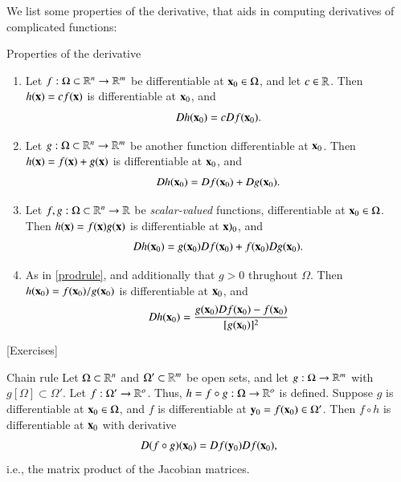 We list some properties of the derivative, that aids in computing derivatives of complicated functions:
\begin{myTheorem}{Properties of the derivative}{}
\begin{enumerate}
    \item Let $f : \Omega \subset \mathbb{R}^n \to \mathbb{R}^m$ be differentiable at $\mathbf{x}_0\in\Omega$, and let $c \in \mathbb{R}$. Then $h(\mathbf{x}) = c f(\mathbf{x})$ is differentiable at $\mathbf{x}_0$, and
    \begin{equation}
        D h(\mathbf{x}_0) = c D f(\mathbf{x}_0).
    \end{equation}
    \item Let $g : \Omega \subset \mathbb{R}^n \to \mathbb{R}^m$ be another function differentiable at $\mathbf{x}_0$. Then $h(\mathbf{x}) = f(\mathbf{x}) + g(\mathbf{x})$ is differentiable at $\mathbf{x}_0$, and
    \begin{equation}
        D h(\mathbf{x}_0) = D f(\mathbf{x}_0) + Dg(\mathbf{x}_0).
    \end{equation}
    \item\label{prodrule} Let $f,g : \Omega \subset\mathbb{R}^n\to \mathbb{R}$ be \emph{scalar-valued} functions, differentiable at $\mathbf{x}_0\in\Omega$. Then $h(\mathbf{x}) = f(\mathbf{x})g(\mathbf{x})$ is differentiable at $\mathbf{x})_0$, and
    \begin{equation}
        Dh(\mathbf{x}_0) = g(\mathbf{x}_0)Df(\mathbf{x}_0) + f(\mathbf{x}_0) Dg(\mathbf{x}_0).
    \end{equation}
    \item As in \ref{prodrule}, and additionally that $g >0$ thrughout $\Omega$. Then $h(\mathbf{x}_0) = f(\mathbf{x}_0)/g(\mathbf{x}_0)$ is differentiable at $\mathbf{x}_0$, and
    \begin{equation}
        Dh(\mathbf{x}_0) = \frac{g(\mathbf{x}_0)Df(\mathbf{x}_0) - f(\mathbf{x}_0)} {[g(\mathbf{x}_0)]^2}
    \end{equation}
\end{enumerate}
\end{myTheorem}

[Exercises]

\begin{myTheorem}{Chain rule}{}
    Let $\Omega \subset \mathbb{R}^n$ and $\Omega' \subset \mathbb{R}^m$ be open sets, and let $g : \Omega \to \mathbb{R}^m$ with $g[\Omega] \subset \Omega'$. Let $f : \Omega' \to \mathbb{R}^o$. Thus, $h = f \circ g : \Omega \to\mathbb{R}^o$ is defined. Suppose $g$ is differentiable at $\mathbf{x}_0\in\Omega$, and $f$ is differentiable at $\mathbf{y}_0 = f(\mathbf{x}_0)\in\Omega'$. Then  $f \circ h$ is differentiable at $\mathbf{x}_0$ with derivative
    \begin{equation}
        D(f \circ g)(\mathbf{x}_0) = Df(\mathbf{y}_0)Df(\mathbf{x}_0),
    \end{equation}
    i.e., the matrix product of the Jacobian matrices.
\end{myTheorem}

